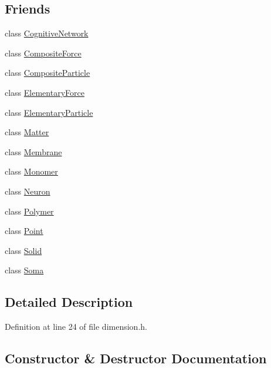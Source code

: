 \subsection*{Friends}
\begin{DoxyCompactItemize}
\item 
class \mbox{\hyperlink{class_dimension_ad04bbaef84caa0d408ec09a1c1302f5f}{Cognitive\+Network}}
\item 
class \mbox{\hyperlink{class_dimension_a1dacbeca8e464bdc533a40a1b18f33b2}{Composite\+Force}}
\item 
class \mbox{\hyperlink{class_dimension_a8be5cf46db5f9876c49d58e4ab84044b}{Composite\+Particle}}
\item 
class \mbox{\hyperlink{class_dimension_a6e57500586e9cd366f5cf76ea0299957}{Elementary\+Force}}
\item 
class \mbox{\hyperlink{class_dimension_af2ace341c1d7ccd30de3502502773591}{Elementary\+Particle}}
\item 
class \mbox{\hyperlink{class_dimension_a01ab5ef28c10ff1c9ed0c618fa044aea}{Matter}}
\item 
class \mbox{\hyperlink{class_dimension_ac790db405644a01723104c3c0c8128bb}{Membrane}}
\item 
class \mbox{\hyperlink{class_dimension_a9175d4e959674956ccb487d060bac93f}{Monomer}}
\item 
class \mbox{\hyperlink{class_dimension_aa410d74ba34b18a9f6bdf24323c4ee5b}{Neuron}}
\item 
class \mbox{\hyperlink{class_dimension_ae64ddc1700c5abc4106cbcc5843a4a42}{Polymer}}
\item 
class \mbox{\hyperlink{class_dimension_aa238d52f825b8ea8da6a5c4ae1b8d482}{Point}}
\item 
class \mbox{\hyperlink{class_dimension_a5636b9113fd1246b3392dd52b3138229}{Solid}}
\item 
class \mbox{\hyperlink{class_dimension_aaa07b7b364b620b9a781f30a5cd9f5ea}{Soma}}
\end{DoxyCompactItemize}


\subsection{Detailed Description}


Definition at line 24 of file dimension.\+h.



\subsection{Constructor \& Destructor Documentation}
\mbox{\label{class_dimension_aa61dad15f33b6c3d09028ba9e545aa70}} 
